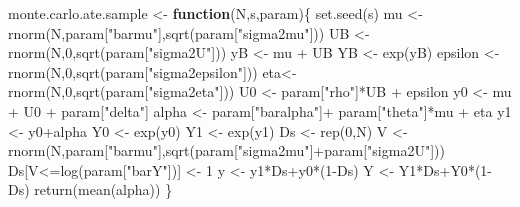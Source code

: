 \documentclass[
]{book}
\newenvironment{Shaded}{\begin{snugshade}}{\end{snugshade}}
\newcommand{\ControlFlowTok}[1]{\textcolor[rgb]{0.13,0.29,0.53}{\textbf{#1}}}
\newcommand{\DecValTok}[1]{\textcolor[rgb]{0.00,0.00,0.81}{#1}}
\newcommand{\FunctionTok}[1]{\textcolor[rgb]{0.00,0.00,0.00}{#1}}
\newcommand{\NormalTok}[1]{#1}
\newcommand{\OtherTok}[1]{\textcolor[rgb]{0.56,0.35,0.01}{#1}}
\newcommand{\SpecialCharTok}[1]{\textcolor[rgb]{0.00,0.00,0.00}{#1}}
\newcommand{\StringTok}[1]{\textcolor[rgb]{0.31,0.60,0.02}{#1}}
\theoremstyle{definition}
\theoremstyle{definition}
\theoremstyle{definition}
\theoremstyle{definition}
\theoremstyle{remark}
\begin{document}
\begin{Shaded}
\begin{Highlighting}[]
\NormalTok{monte.carlo.ate.sample }\OtherTok{\textless{}{-}} \ControlFlowTok{function}\NormalTok{(N,s,param)\{}
  \FunctionTok{set.seed}\NormalTok{(s)}
\NormalTok{  mu }\OtherTok{\textless{}{-}} \FunctionTok{rnorm}\NormalTok{(N,param[}\StringTok{"barmu"}\NormalTok{],}\FunctionTok{sqrt}\NormalTok{(param[}\StringTok{"sigma2mu"}\NormalTok{]))}
\NormalTok{  UB }\OtherTok{\textless{}{-}} \FunctionTok{rnorm}\NormalTok{(N,}\DecValTok{0}\NormalTok{,}\FunctionTok{sqrt}\NormalTok{(param[}\StringTok{"sigma2U"}\NormalTok{]))}
\NormalTok{  yB }\OtherTok{\textless{}{-}}\NormalTok{ mu }\SpecialCharTok{+}\NormalTok{ UB }
\NormalTok{  YB }\OtherTok{\textless{}{-}} \FunctionTok{exp}\NormalTok{(yB)}
\NormalTok{  epsilon }\OtherTok{\textless{}{-}} \FunctionTok{rnorm}\NormalTok{(N,}\DecValTok{0}\NormalTok{,}\FunctionTok{sqrt}\NormalTok{(param[}\StringTok{"sigma2epsilon"}\NormalTok{]))}
\NormalTok{  eta}\OtherTok{\textless{}{-}} \FunctionTok{rnorm}\NormalTok{(N,}\DecValTok{0}\NormalTok{,}\FunctionTok{sqrt}\NormalTok{(param[}\StringTok{"sigma2eta"}\NormalTok{]))}
\NormalTok{  U0 }\OtherTok{\textless{}{-}}\NormalTok{ param[}\StringTok{"rho"}\NormalTok{]}\SpecialCharTok{*}\NormalTok{UB }\SpecialCharTok{+}\NormalTok{ epsilon}
\NormalTok{  y0 }\OtherTok{\textless{}{-}}\NormalTok{ mu }\SpecialCharTok{+}\NormalTok{  U0 }\SpecialCharTok{+}\NormalTok{ param[}\StringTok{"delta"}\NormalTok{]}
\NormalTok{  alpha }\OtherTok{\textless{}{-}}\NormalTok{ param[}\StringTok{"baralpha"}\NormalTok{]}\SpecialCharTok{+}\NormalTok{  param[}\StringTok{"theta"}\NormalTok{]}\SpecialCharTok{*}\NormalTok{mu }\SpecialCharTok{+}\NormalTok{ eta}
\NormalTok{  y1 }\OtherTok{\textless{}{-}}\NormalTok{ y0}\SpecialCharTok{+}\NormalTok{alpha}
\NormalTok{  Y0 }\OtherTok{\textless{}{-}} \FunctionTok{exp}\NormalTok{(y0)}
\NormalTok{  Y1 }\OtherTok{\textless{}{-}} \FunctionTok{exp}\NormalTok{(y1)}
\NormalTok{  Ds }\OtherTok{\textless{}{-}} \FunctionTok{rep}\NormalTok{(}\DecValTok{0}\NormalTok{,N)}
\NormalTok{  V }\OtherTok{\textless{}{-}} \FunctionTok{rnorm}\NormalTok{(N,param[}\StringTok{"barmu"}\NormalTok{],}\FunctionTok{sqrt}\NormalTok{(param[}\StringTok{"sigma2mu"}\NormalTok{]}\SpecialCharTok{+}\NormalTok{param[}\StringTok{"sigma2U"}\NormalTok{]))}
\NormalTok{  Ds[V}\SpecialCharTok{\textless{}=}\FunctionTok{log}\NormalTok{(param[}\StringTok{"barY"}\NormalTok{])] }\OtherTok{\textless{}{-}} \DecValTok{1} 
\NormalTok{  y }\OtherTok{\textless{}{-}}\NormalTok{ y1}\SpecialCharTok{*}\NormalTok{Ds}\SpecialCharTok{+}\NormalTok{y0}\SpecialCharTok{*}\NormalTok{(}\DecValTok{1}\SpecialCharTok{{-}}\NormalTok{Ds)}
\NormalTok{  Y }\OtherTok{\textless{}{-}}\NormalTok{ Y1}\SpecialCharTok{*}\NormalTok{Ds}\SpecialCharTok{+}\NormalTok{Y0}\SpecialCharTok{*}\NormalTok{(}\DecValTok{1}\SpecialCharTok{{-}}\NormalTok{Ds)}
  \FunctionTok{return}\NormalTok{(}\FunctionTok{mean}\NormalTok{(alpha))}
\NormalTok{\}}


\end{Highlighting}
\end{Shaded}
\end{document}
